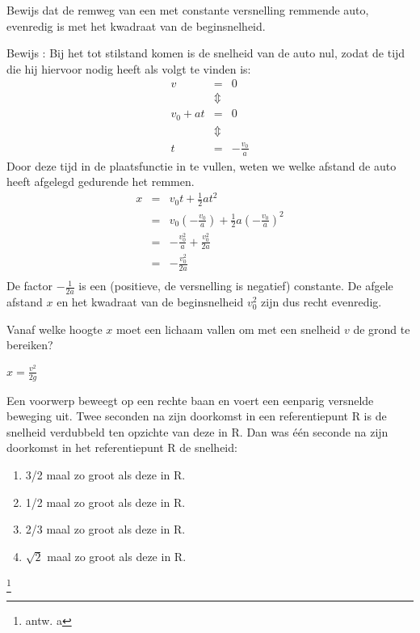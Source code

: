 \documentclass{ximera}
\begin{document}
\begin{exercise} Bewijs dat de remweg van een met constante versnelling remmende auto, evenredig is met het kwadraat van de beginsnelheid.
\begin{oplossing}
Bewijs : 
Bij het tot stilstand komen is de snelheid van de auto nul, zodat de tijd die hij hiervoor nodig heeft als volgt te vinden is:
\begin{eqnarray*}
v&=&0\\
&\Updownarrow&\\
v_0+at&=&0\\
&\Updownarrow&\\
t&=&-\frac{v_0}{a}
\end{eqnarray*}
Door deze tijd in de plaatsfunctie in te vullen, weten we welke afstand de auto heeft afgelegd gedurende het remmen.
\begin{eqnarray*}
x&=&v_0t+\frac{1}{2}at^2\\
&=&v_0\left(-\frac{v_0}{a}\right)+\frac{1}{2}a\left(-\frac{v_0}{a}\right)^2\\
&=&-\frac{v_0^2}{a}+\frac{v_0^2}{2a}\\
&=&-\frac{v_0^2}{2a}\\
\end{eqnarray*}
De factor $-\frac{1}{2a}$ is een (positieve, de versnelling is negatief) constante. De afgele afstand $x$ en het kwadraat van de beginsnelheid $v_0^2$ zijn dus recht evenredig. 
\end{oplossing}

\end{exercise}

\begin{exercise} Vanaf welke hoogte $x$ moet een lichaam vallen om met een snelheid $v$ de grond te bereiken?

\begin{oplossing}
	$x=\frac{v^2}{2g}$
\end{oplossing}



\end{exercise}

\begin{exercise} Een voorwerp beweegt op een rechte baan en
voert een eenparig versnelde beweging uit. Twee seconden na zijn
doorkomst in een referentiepunt R is de snelheid verdubbeld ten
opzichte van deze in R.
\newline
\newline
Dan was \'e\'en seconde na zijn doorkomst in het referentiepunt R de
snelheid:
\begin{enumerate}
\item 3/2 maal zo groot als deze in R.
\item 1/2 maal zo groot als deze in R.
\item 2/3 maal zo groot als deze in R.
\item $\sqrt{2}$ maal zo groot als deze in R.
\end{enumerate}
\footnote{antw. a}



\end{exercise}
\end{document}

